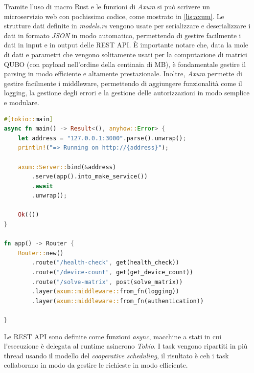 
Tramite l'uso di macro Rust e le funzioni di \textit{Axum} si può scrivere un microservizio web con pochissimo codice, come mostrato in \ref{lis:axum}. Le strutture dati definite in \textit{models.rs} vengono usate per serializzare e deserializzare i dati in formato \textit{JSON} in modo automatico, permettendo di gestire facilmente i dati in input e in output delle REST API. È importante notare che, data la mole di dati e parametri che vengono solitamente usati per la computazione di matrici QUBO (con payload nell'ordine della centinaia di MB), è fondamentale gestire il parsing in modo efficiente e altamente prestazionale. 
Inoltre, \textit{Axum} permette di gestire facilmente i middleware, permettendo di aggiungere funzionalità come il logging, la gestione degli errori e la gestione delle autorizzazioni in modo semplice e modulare.

\vspace{5mm}
\begin{lstlisting}[language=Rust, caption=Inizializzazione Axum, label=lis:axum]
#[tokio::main]
async fn main() -> Result<(), anyhow::Error> {
    let address = "127.0.0.1:3000".parse().unwrap();
    println!("=> Running on http://{address}");

    axum::Server::bind(&address)
        .serve(app().into_make_service())
        .await
        .unwrap();

    Ok(())
}

fn app() -> Router {
    Router::new()
        .route("/health-check", get(health_check))
        .route("/device-count", get(get_device_count))
        .route("/solve-matrix", post(solve_matrix))
        .layer(axum::middleware::from_fn(logging))
        .layer(axum::middleware::from_fn(authentication))

}
\end{lstlisting}
\vspace{5mm}

Le REST API sono definite come funzioni \textit{async}, macchine a stati in cui l'esecuzione è delegata al runtime asincrono \textit{Tokio}. I task vengono ripartiti in più thread usando il modello del \textit{cooperative scheduling}, il risultato è ceh i task collaborano in modo da gestire le richieste in modo efficiente.

